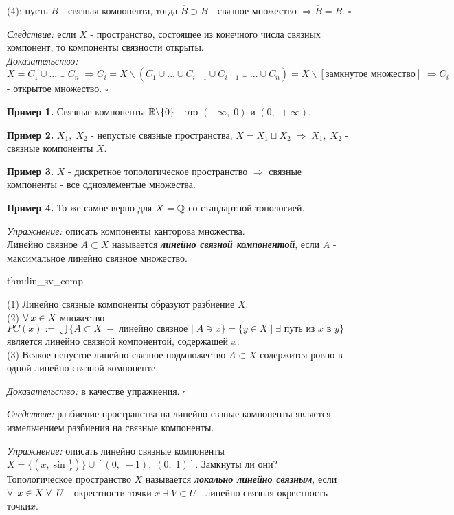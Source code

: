 \documentclass[../../main.tex]{subfiles}
\begin{document}
(4): пусть $B$ - связная компонента, тогда $\overline B \supset B$ - связное множество $\Rightarrow \overline B = B$. $\square$

\textit{Следствие:} если $X$ - пространство, состоящее из конечного числа связных компонент, то компоненты связности открыты.\\
\textit{Доказательство:}
$X = C_1\cup...\cup C_n \; \Rightarrow C_i = X\backslash (C_1\cup...\cup C_{i-1}\cup C_{i+1}\cup...\cup C_n) = X\backslash [\text{замкнутое множество}]\; \Rightarrow C_i$ - открытое множество. $\square$

\textbf{Пример 1.} Связные компоненты $\mathbb{R} \backslash \{0\} $ - это $ (-\infty,\; 0)$ и $(0,\; +\infty)$.

\textbf{Пример 2.} $X_1,\; X_2$ - непустые связные пространства, $X = X_1\sqcup X_2 \; \Rightarrow \; X_1, \; X_2$ - связные компоненты $X$. 

\textbf{Пример 3.} $X$ - дискретное топологическое пространство $\Rightarrow$ связные компоненты - все одноэлементые множества.

\textbf{Пример 4.} То же самое верно для $X = \mathbb{Q}$ со стандартной топологией.

\textit{Упражнение:} описать компоненты канторова множества.\\
 Линейно связное $A\subset X$ называется \textbf{\textit{линейно связной компонентой}}, если $A$ - максимальное линейно связное множество.

\begin{theo}{thm:lin_sv_comp}

(1) Линейно связные компоненты образуют разбиение $X$.\\
(2) $\forall\: x\in X$ множество $PC(x):=\bigcup\{A\subset X\;-\; \text{линейно связное } |\; A\ni x \} = \{y\in X \; | \; \exists \text{ путь из }x \text{ в }y\}$ является линейно связной компонентой, содержащей $x$.\\
(3) Всякое непустое линейно связное подмножество $A\subset X$ содержится ровно в одной линейно связной компоненте.
\end{theo}
\textit{Доказательство:} в качестве упражнения. $\square$

\textit{Следствие:} разбиение пространства на линейно свзные компоненты является измельчением разбиения на связные компоненты.

\textit{Упражнение:} описать линейно связные компоненты $X = \{(x,\sin\frac1x)\}\cup [(0,\; -1),\; (0,\; 1)]$. Замкнуты ли они?\\
 Топологическое пространство $X$ называется \textbf{\textit{локально линейно связным}}, если $\forall\:\; x\in X\; \forall\: \; U$ - окрестности точки $ x \; \exists \; V\subset U$ - линейно связная окрестность точки$x$.
\end{document}
